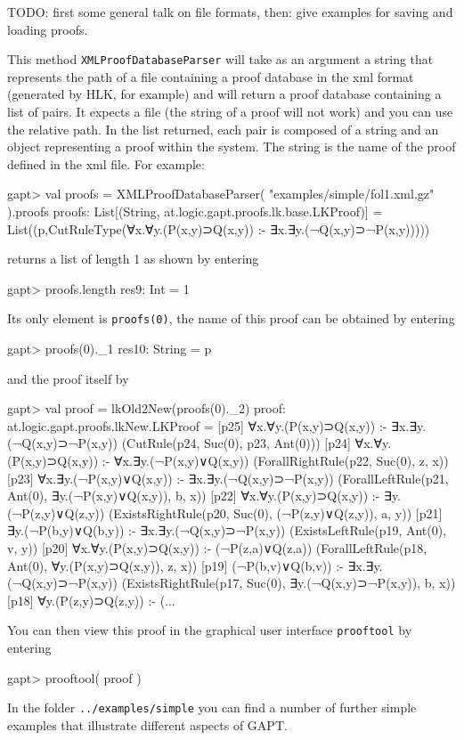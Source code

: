 \documentclass[a4paper,11pt]{article}
\newcommand{\cli}[1]{{\tt {#1}}}
\newenvironment{meta}{\color{red}}{\color{black}} %
\begin{document}
\begin{meta}
TODO: first some general talk on file formats, then: give examples for saving and loading
proofs.
\end{meta}

This method \texttt{XMLProofDatabaseParser} will take as an argument a string that represents the path of a file
containing a proof database in the xml format (generated by HLK, for example) and
will return a proof database containing a list 
of pairs. It expects a file (the string of a proof will not work) and you can use 
the relative path. In the list returned, each pair is composed of a string and 
an object representing a proof within the system. The string is the name of the 
proof defined in the xml file. For example:
%
\begin{clilisting}
gapt> val proofs = XMLProofDatabaseParser( "examples/simple/fol1.xml.gz" ).proofs
proofs: List[(String, at.logic.gapt.proofs.lk.base.LKProof)] = List((p,CutRuleType(∀x.∀y.(P(x,y)⊃Q(x,y)) :- ∃x.∃y.(¬Q(x,y)⊃¬P(x,y)))))

\end{clilisting}
%
returns a list of length 1 as shown by entering
%
\begin{clilisting}
gapt> proofs.length
res9: Int = 1

\end{clilisting}
%
Its only element is \cli{proofs(0)}, the name of this proof can be obtained by
entering
%
\begin{clilisting}
gapt> proofs(0)._1
res10: String = p

\end{clilisting}
%
and the proof itself by
%
\begin{clilisting}
gapt> val proof = lkOld2New(proofs(0)._2)
proof: at.logic.gapt.proofs.lkNew.LKProof =
[p25] ∀x.∀y.(P(x,y)⊃Q(x,y)) :- ∃x.∃y.(¬Q(x,y)⊃¬P(x,y))    (CutRule(p24, Suc(0), p23, Ant(0)))
[p24] ∀x.∀y.(P(x,y)⊃Q(x,y)) :- ∀x.∃y.(¬P(x,y)∨Q(x,y))    (ForallRightRule(p22, Suc(0), z, x))
[p23] ∀x.∃y.(¬P(x,y)∨Q(x,y)) :- ∃x.∃y.(¬Q(x,y)⊃¬P(x,y))    (ForallLeftRule(p21, Ant(0), ∃y.(¬P(x,y)∨Q(x,y)), b, x))
[p22] ∀x.∀y.(P(x,y)⊃Q(x,y)) :- ∃y.(¬P(z,y)∨Q(z,y))    (ExistsRightRule(p20, Suc(0), (¬P(z,y)∨Q(z,y)), a, y))
[p21] ∃y.(¬P(b,y)∨Q(b,y)) :- ∃x.∃y.(¬Q(x,y)⊃¬P(x,y))    (ExistsLeftRule(p19, Ant(0), v, y))
[p20] ∀x.∀y.(P(x,y)⊃Q(x,y)) :- (¬P(z,a)∨Q(z,a))    (ForallLeftRule(p18, Ant(0), ∀y.(P(x,y)⊃Q(x,y)), z, x))
[p19] (¬P(b,v)∨Q(b,v)) :- ∃x.∃y.(¬Q(x,y)⊃¬P(x,y))    (ExistsRightRule(p17, Suc(0), ∃y.(¬Q(x,y)⊃¬P(x,y)), b, x))
[p18] ∀y.(P(z,y)⊃Q(z,y)) :- (...
\end{clilisting}
%
You can then view this proof in the graphical user interface \texttt{prooftool} by 
entering
%
\begin{clilisting}
gapt> prooftool( proof )

\end{clilisting}
%
In the folder \cli{../examples/simple} you can find a number of further simple
examples that illustrate different aspects of GAPT.
\end{document}
